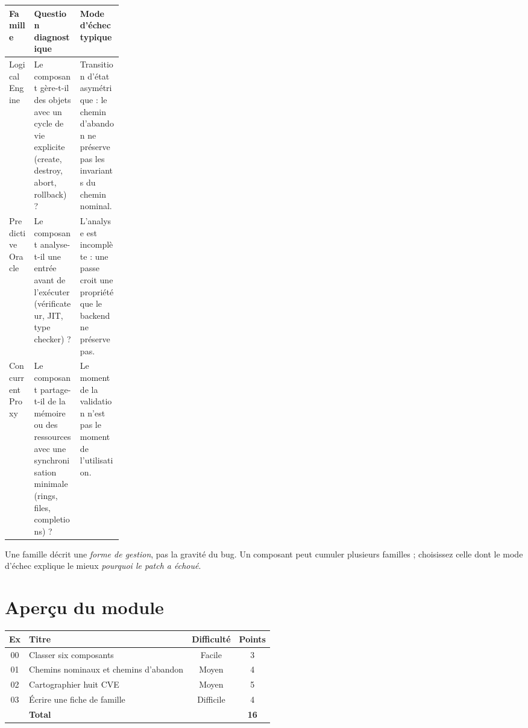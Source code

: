 \documentclass{training}
\begin{document}
\begin{center}
\begin{tabularx}{\linewidth}{|p{0.22\linewidth}|X|X|}
\hline
\textbf{Famille} & \textbf{Question diagnostique} & \textbf{Mode d'échec typique} \\ \hline
Logical Engine & Le composant gère-t-il des objets avec un cycle de vie
explicite (create, destroy, abort, rollback) ? & Transition d'état
asymétrique : le chemin d'abandon ne préserve pas les invariants du chemin
nominal. \\ \hline
Predictive Oracle & Le composant analyse-t-il une entrée avant de
l'exécuter (vérificateur, JIT, type checker) ? & L'analyse est incomplète :
une passe croit une propriété que le backend ne préserve pas. \\ \hline
Concurrent Proxy & Le composant partage-t-il de la mémoire ou des
ressources avec une synchronisation minimale (rings, files, completions) ? &
Le moment de la validation n'est pas le moment de l'utilisation. \\ \hline
\end{tabularx}
\end{center}

\begin{info}
Une famille décrit une \emph{forme de gestion}, pas la gravité du bug. Un
composant peut cumuler plusieurs familles ; choisissez celle dont le mode
d'échec explique le mieux \emph{pourquoi le patch a échoué}.
\end{info}

\chapter{Aperçu du module}

\begin{center}
\begin{tabularx}{\linewidth}{|c|l|c|c|}
\hline
\textbf{Ex} & \textbf{Titre} & \textbf{Difficulté} & \textbf{Points} \\ \hline
00 & Classer six composants & Facile & 3 \\
01 & Chemins nominaux et chemins d'abandon & Moyen & 4 \\
02 & Cartographier huit CVE & Moyen & 5 \\
03 & Écrire une fiche de famille & Difficile & 4 \\ \hline
& \textbf{Total} & & \textbf{16} \\ \hline
\end{tabularx}
\end{center}
\end{document}
